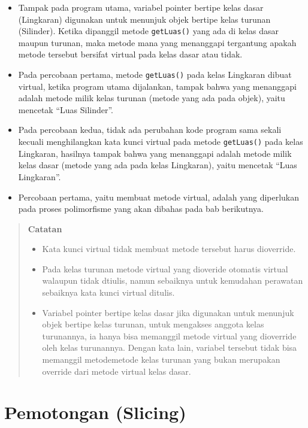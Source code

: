 \begin{itemize}
\tightlist
\item
  Tampak pada program utama, variabel pointer bertipe kelas dasar
  (Lingkaran) digunakan untuk menunjuk objek bertipe kelas turunan
  (Silinder). Ketika dipanggil metode \texttt{getLuas()} yang ada di
  kelas dasar maupun turunan, maka metode mana yang menanggapi
  tergantung apakah metode tersebut bersifat virtual pada kelas dasar
  atau tidak.
\item
  Pada percobaan pertama, metode \texttt{getLuas()} pada kelas Lingkaran
  dibuat virtual, ketika program utama dijalankan, tampak bahwa yang
  menanggapi adalah metode milik kelas turunan (metode yang ada pada
  objek), yaitu mencetak ``Luas Silinder''.
\item
  Pada percobaan kedua, tidak ada perubahan kode program sama sekali
  kecuali menghilangkan kata kunci virtual pada metode
  \texttt{getLuas()} pada kelas Lingkaran, hasilnya tampak bahwa yang
  menanggapi adalah metode milik kelas dasar (metode yang ada pada kelas
  Lingkaran), yaitu mencetak ``Luas Lingkaran''.
\item
  Percobaan pertama, yaitu membuat metode virtual, adalah yang
  diperlukan pada proses polimorfisme yang akan dibahas pada bab
  berikutnya.
\end{itemize}
\begin{quotation}
	\textbf{Catatan} 
	\begin{itemize}
		\item Kata
		kunci virtual tidak membuat metode tersebut harus dioverride.
		\item Pada kelas turunan metode virtual yang dioveride
		otomatis virtual walaupun tidak dtiulis, namun sebaiknya untuk kemudahan
		perawatan sebaiknya kata kunci virtual ditulis.
		\item Variabel pointer bertipe kelas dasar jika digunakan untuk menunjuk objek
		bertipe kelas turunan, untuk mengakses anggota kelas turunannya, ia
		hanya bisa memanggil metode virtual yang dioverride oleh kelas
		turunannya. Dengan kata lain, variabel tersebut tidak bisa memanggil
		metodemetode kelas turunan yang bukan merupakan override dari metode
		virtual kelas dasar.
	\end{itemize}
\end{quotation}
 

\section{Pemotongan (Slicing)}\label{pemotongan-slicing}

